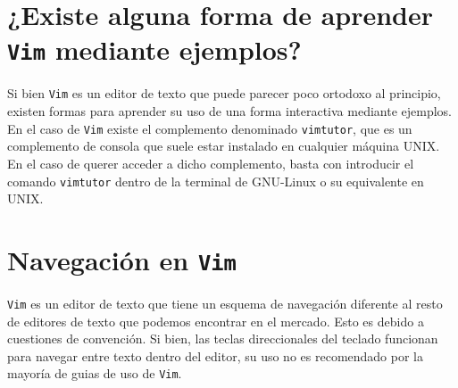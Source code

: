 \documentclass[10pt]{article}
\begin{document}
\section{¿Existe alguna forma de aprender \texttt{Vim} mediante ejemplos?}
Si bien \texttt{Vim} es un editor de texto que puede parecer poco ortodoxo al principio, existen formas para aprender su uso de una forma interactiva mediante ejemplos. En el caso de \texttt{Vim} existe el complemento denominado \texttt{vimtutor}, que es un complemento de consola que suele estar instalado en cualquier máquina UNIX. En el caso de querer acceder a dicho complemento, basta con introducir el comando \texttt{vimtutor} dentro de la terminal de GNU-Linux o su equivalente en UNIX. 
\section{Navegación en \texttt{Vim}}
\texttt{Vim} es un editor de texto que tiene un esquema de navegación diferente al resto de editores de texto que podemos encontrar en el mercado. Esto es debido a cuestiones de convención. 
Si bien, las teclas direccionales del teclado funcionan para navegar entre texto dentro del editor, su uso no es recomendado por la mayoría de guias de uso de \texttt{Vim}. \\
\end{document}
